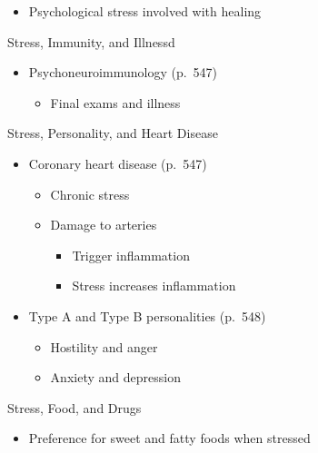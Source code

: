 \documentclass[
]{book}
\providecommand{\tightlist}{%
  \setlength{\itemsep}{0pt}\setlength{\parskip}{0pt}}
\begin{document}
\begin{reflect}
\begin{itemize}
  \begin{itemize}
  \tightlist
  \item
    Psychological stress involved with healing
  \end{itemize}
\end{itemize}

Stress, Immunity, and Illnessd

\begin{itemize}
\tightlist
\item
  Psychoneuroimmunology (p.~547)

  \begin{itemize}
  \tightlist
  \item
    Final exams and illness
  \end{itemize}
\end{itemize}

Stress, Personality, and Heart Disease

\begin{itemize}
\tightlist
\item
  Coronary heart disease (p.~547)

  \begin{itemize}
  \tightlist
  \item
    Chronic stress\\
  \item
    Damage to arteries

    \begin{itemize}
    \tightlist
    \item
      Trigger inflammation\\
    \item
      Stress increases inflammation\\
    \end{itemize}
  \end{itemize}
\item
  Type A and Type B personalities (p.~548)

  \begin{itemize}
  \tightlist
  \item
    Hostility and anger\\
  \item
    Anxiety and depression
  \end{itemize}
\end{itemize}

Stress, Food, and Drugs

\begin{itemize}
\tightlist
\item
  Preference for sweet and fatty foods when stressed


\end{itemize}
\end{reflect}
\end{document}
